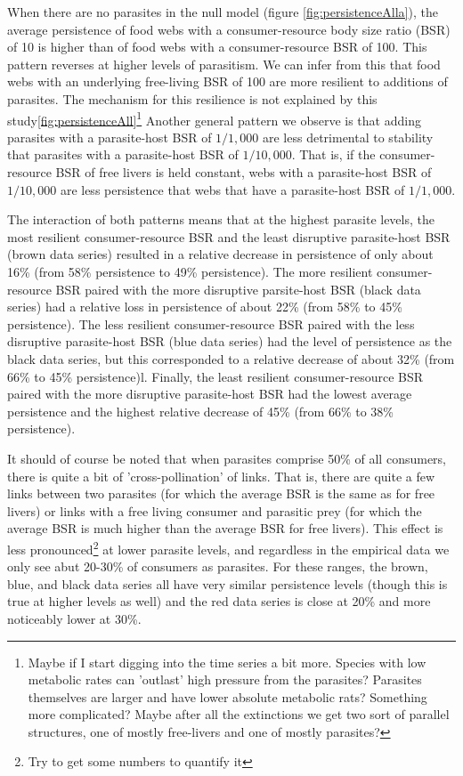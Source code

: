 \documentclass[11pt]{amsart}
\begin{document}
When there are no parasites in the null model (figure \ref{fig:persistenceAlla}), the average persistence of food webs with a consumer-resource body size ratio (BSR) of 10 is higher than of food webs with a consumer-resource BSR of 100.  This pattern reverses at higher levels of parasitism.  We can infer from this that food webs with an underlying free-living BSR of 100 are more resilient to additions of parasites.  The mechanism for this resilience is not explained by this study\ref{fig:persistenceAll}\footnote{Maybe if I start digging into the time series a bit more.  Species with low metabolic rates can 'outlast' high pressure from the parasites? Parasites themselves are larger and have lower absolute metabolic rats? Something more complicated?  Maybe after all the extinctions we get two sort of parallel structures, one of mostly free-livers and one of mostly parasites?}   
Another general pattern we observe is that adding parasites with a parasite-host BSR of $1/1,000$ are less detrimental to stability that parasites with a parasite-host BSR of $1/10,000$.  That is, if the consumer-resource BSR of free livers is held constant, webs with a parasite-host BSR of $1/10,000$ are less persistence that webs that have a parasite-host BSR of $1/1,000$.

The interaction of both patterns means that at the highest parasite levels, the most resilient consumer-resource BSR and the least disruptive parasite-host BSR (brown data series) resulted in a relative decrease in persistence of only about 16\% (from 58\% persistence to 49\% persistence).  The more resilient consumer-resource BSR paired with the more disruptive parsite-host BSR (black data series) had a relative loss in persistence of about 22\% (from 58\% to 45\% persistence). The less resilient consumer-resource BSR paired with the less disruptive parasite-host BSR (blue data series) had the level of persistence as the black data series, but this corresponded to a relative decrease of about 32\% (from 66\% to 45\% persistence)l.  Finally, the least resilient consumer-resource BSR paired with the more disruptive parasite-host BSR had the lowest average persistence and the highest relative decrease of 45\% (from 66\% to 38\% persistence). 

It should of course be noted that when parasites comprise 50\% of all consumers, there is quite a bit of 'cross-pollination' of links.  That is, there are quite a few links between two parasites (for which the average BSR is the same as for free livers) or links with a free living consumer and parasitic prey (for which the average BSR is much higher than the average BSR for free livers).  This effect is less pronounced\footnote{Try to get some numbers to quantify it} at lower parasite levels, and regardless in the empirical data we only see abut 20-30\% of consumers as parasites.  For these ranges, the brown, blue, and black data series all have very similar persistence levels (though this is true at higher levels as well) and the red data series is close at 20\% and more noticeably lower at 30\%.
\end{document}
